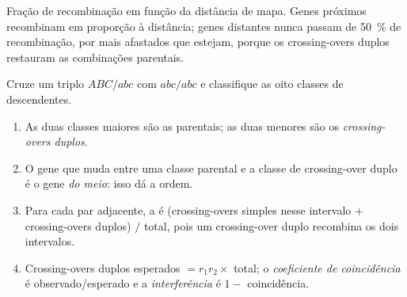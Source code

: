 \begin{omfigure}

{\small Fração de recombinação em função da distância de mapa. Genes
próximos recombinam em proporção à distância; genes distantes nunca
passam de \qty{50}{\%} de recombinação, por mais afastados que estejam,
porque os crossing-overs duplos restauram as combinações parentais.}
\end{omfigure}

\begin{method}\label{met:b2:meiosis-heredity:threepoint}
Cruze um triplo  $ABC/abc$ com $abc/abc$ e classifique as
oito classes de descendentes.
\begin{enumerate}
  \item As duas classes maiores são as parentais; as duas menores são
        os \emph{crossing-overs duplos}.
  \item O gene que muda entre uma classe parental e a classe de
        crossing-over duplo é o gene \emph{do meio}: isso dá a ordem.
  \item Para cada par adjacente, a  é
        (crossing-overs simples nesse intervalo + crossing-overs
        duplos) $/$ total, pois um crossing-over duplo recombina os dois
        intervalos.
  \item Crossing-overs duplos esperados $= r_1 r_2 \times$ total; o
        \emph{coeficiente de coincidência} é observado/esperado e a
        \emph{interferência} é $1 -$ coincidência.
\end{enumerate}
\end{method}

